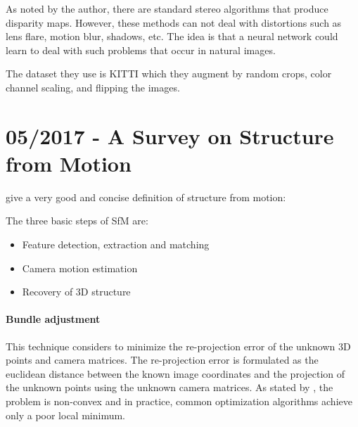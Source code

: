 		As noted by the author, there are standard stereo algorithms that produce disparity maps.
		However, these methods can not deal with distortions such as lens flare, motion blur, shadows, etc.
		The idea is that a neural network could learn to deal with such problems that occur in natural images.
		
		The dataset they use is {KITTI} which they augment by random crops, color channel scaling, and flipping the images.
		
		\section{05/2017 - A Survey on Structure from Motion}
		
			\cite{survey2017} give a very good and concise definition of structure from motion:
			
			
			The three basic steps of SfM are:
			\begin{itemize}
				\item Feature detection, extraction and matching
				\item Camera motion estimation
				\item Recovery of 3D structure
			\end{itemize}
			
			\paragraph{Bundle adjustment} 
				This technique considers to minimize the re-projection error of the unknown 3D points and camera matrices.
				The re-projection error is formulated as the euclidean distance between the known image coordinates and the projection of the unknown points using the unknown camera matrices.
				As stated by \cite{survey2017}, the problem is non-convex and in practice, common optimization algorithms achieve only a poor local minimum.
				
